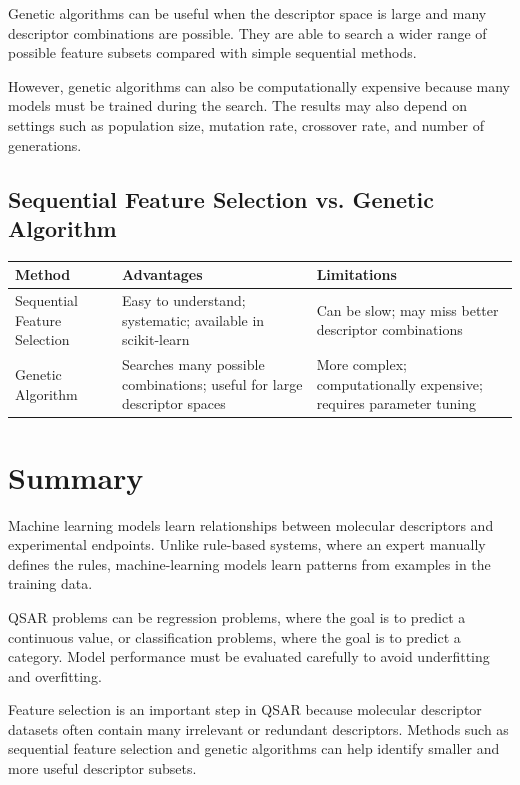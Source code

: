 \documentclass[11pt]{report}
\newenvironment{Important note}{\begin{quote}\color{red}\textbf{Important note:} }{\end{quote}}
\begin{document}
Genetic algorithms can be useful when the descriptor space is large and many descriptor combinations are possible. They are able to search a wider range of possible feature subsets compared with simple sequential methods.

However, genetic algorithms can also be computationally expensive because many models must be trained during the search. The results may also depend on settings such as population size, mutation rate, crossover rate, and number of generations.

\subsection{Sequential Feature Selection vs. Genetic Algorithm}

\begin{center}
\begin{tabular}{p{}p{}p{}}
\toprule
\textbf{Method} & \textbf{Advantages} & \textbf{Limitations} \\
\midrule
Sequential Feature Selection & Easy to understand; systematic; available in scikit-learn & Can be slow; may miss better descriptor combinations \\
Genetic Algorithm & Searches many possible combinations; useful for large descriptor spaces & More complex; computationally expensive; requires parameter tuning \\
\bottomrule
\end{tabular}
\end{center}


\section{Summary}

Machine learning models learn relationships between molecular descriptors and experimental endpoints. Unlike rule-based systems, where an expert manually defines the rules, machine-learning models learn patterns from examples in the training data.

QSAR problems can be regression problems, where the goal is to predict a continuous value, or classification problems, where the goal is to predict a category. Model performance must be evaluated carefully to avoid underfitting and overfitting.

Feature selection is an important step in QSAR because molecular descriptor datasets often contain many irrelevant or redundant descriptors. Methods such as sequential feature selection and genetic algorithms can help identify smaller and more useful descriptor subsets.
\end{document}
